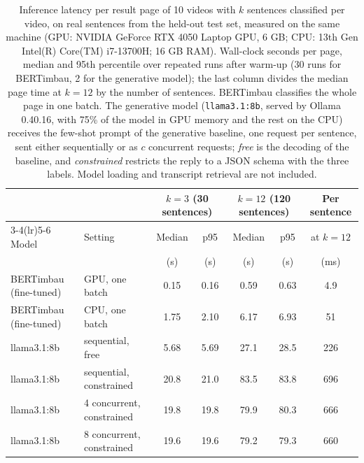 \begin{table}[!t]
\centering
\caption{Inference latency per result page of 10 videos with $k$ sentences classified per video, on real sentences from the held-out test set, measured on the same machine (GPU: NVIDIA GeForce RTX 4050 Laptop GPU, 6 GB; CPU: 13th Gen Intel(R) Core(TM) i7-13700H; 16 GB RAM). Wall-clock seconds per page, median and 95th percentile over repeated runs after warm-up (30 runs for BERTimbau, 2 for the generative model); the last column divides the median page time at $k = 12$ by the number of sentences. BERTimbau classifies the whole page in one batch. The generative model (\texttt{llama3.1:8b}, served by Ollama 0.40.16, with 75\% of the model in GPU memory and the rest on the CPU) receives the few-shot prompt of the generative baseline, one request per sentence, sent either sequentially or as $c$ concurrent requests; \emph{free} is the decoding of the baseline, and \emph{constrained} restricts the reply to a JSON schema with the three labels. Model loading and transcript retrieval are not included.}
\label{tab:latencia}
\begin{tabular}{llccccc}
\toprule
 &  & \multicolumn{2}{c}{$k = 3$ (30 sentences)} & \multicolumn{2}{c}{$k = 12$ (120 sentences)} & Per sentence \\
\cmidrule(lr){3-4}\cmidrule(lr){5-6}
Model & Setting & Median & p95 & Median & p95 & at $k = 12$ \\
 &  & (s) & (s) & (s) & (s) & (ms) \\
\midrule
BERTimbau (fine-tuned) & GPU, one batch & 0.15 & 0.16 & 0.59 & 0.63 & 4.9 \\
BERTimbau (fine-tuned) & CPU, one batch & 1.75 & 2.10 & 6.17 & 6.93 & 51 \\
llama3.1:8b & sequential, free & 5.68 & 5.69 & 27.1 & 28.5 & 226 \\
llama3.1:8b & sequential, constrained & 20.8 & 21.0 & 83.5 & 83.8 & 696 \\
llama3.1:8b & 4 concurrent, constrained & 19.8 & 19.8 & 79.9 & 80.3 & 666 \\
llama3.1:8b & 8 concurrent, constrained & 19.6 & 19.6 & 79.2 & 79.3 & 660 \\
\bottomrule
\end{tabular}
\end{table}
